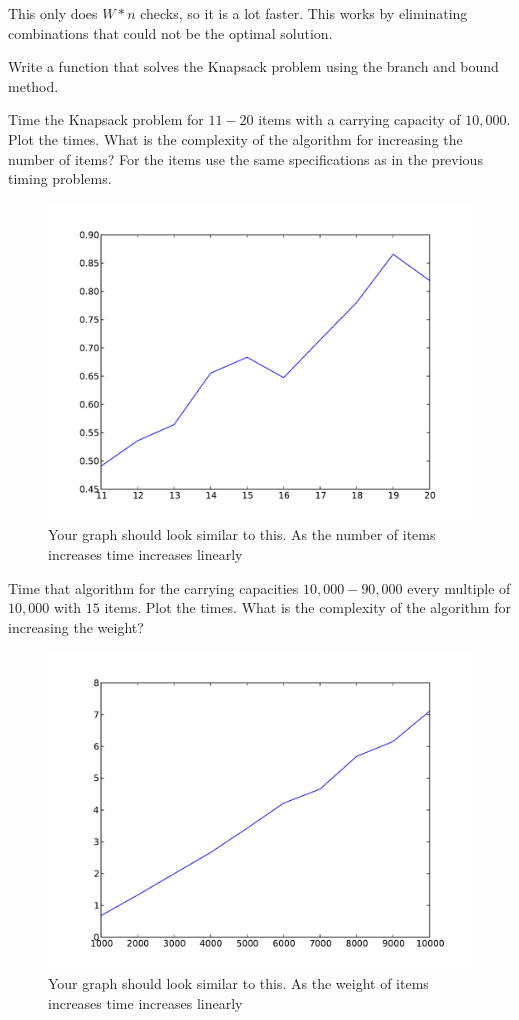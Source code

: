 This only does $W*n$ checks, so it is a lot faster.
This works by eliminating combinations that could not be the optimal solution.

\begin{problem}
Write a function that solves the Knapsack problem using the branch and bound method.
\end{problem}

\begin{problem}
Time the Knapsack problem for $11-20$ items with a carrying capacity of $10,000$.
Plot the times.
What is the complexity of the algorithm for increasing the number of items?
For the items use the same specifications as in the previous timing problems.
\end{problem}

\begin{figure}[H]
\includegraphics[scale = .5]{dynamicTime.pdf}
\caption{
Your graph should look similar to this.
As the number of items increases time increases linearly}
\end{figure}

\begin{problem}
Time that algorithm for the carrying capacities $10,000-90,000$ every multiple of $10,000$ with $15$ items.
Plot the times.
What is the complexity of the algorithm for increasing the weight?
\end{problem}

\begin{figure}[H]
\includegraphics[scale = .5]{dynamicWeight.pdf}
\caption{
Your graph should look similar to this.
As the weight of items increases time increases linearly}
\end{figure}
